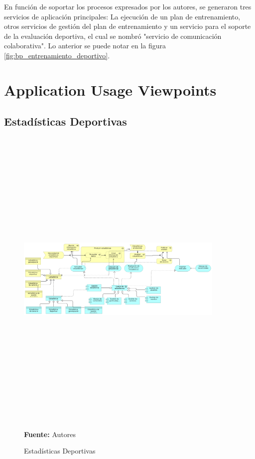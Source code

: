 En función de soportar los procesos expresados por los autores, se generaron tres servicios de aplicación principales: La ejecución de un plan de entrenamiento, otros servicios de gestión del plan de entrenamiento y un servicio para el soporte de la evaluación deportiva, el cual se nombró "servicio de comunicación colaborativa". Lo anterior se puede notar en la figura \ref{fig:bp_entrenamiento_deportivo}.

\section{Application Usage Viewpoints}

\subsection{Estadísticas Deportivas}

\begin{figure}[!htb]
  \begin{center}
    \includegraphics[angle=90,width=10cm,height=15cm]{./imagenes/Archimate/vistas/application_usage/estadisticasdeportivas.png}
    \caption{Estadísticas Deportivas}
    \label{fig:au_estadisticas_deportivas}
    \textbf{Fuente:}  Autores \\
  \end{center}
\end{figure}


